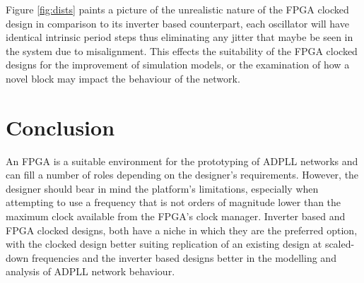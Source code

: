 \documentclass[conference]{IEEEtran}
\begin{document}
Figure \ref{fig:dists} paints a picture of the unrealistic nature of the FPGA clocked design in comparison to its inverter based counterpart, each oscillator will have identical intrinsic period steps thus eliminating any jitter that maybe be seen in the system due to misalignment. This effects the suitability of the FPGA clocked designs for the improvement of simulation models, or the examination of how a novel block may impact the behaviour of the network.
\section*{Conclusion}
An FPGA is a suitable environment for the prototyping of ADPLL networks and can fill a number of roles depending on the designer's requirements. However, the designer should bear in mind the platform's limitations, especially when attempting to use a frequency that is not orders of magnitude lower than the maximum clock available from the FPGA's clock manager. Inverter based and FPGA clocked designs, both have a niche in which they are the preferred option, with the clocked design better suiting replication of an existing design at scaled-down frequencies and the inverter based designs better in the modelling and analysis of ADPLL network behaviour.


 
\end{document}

